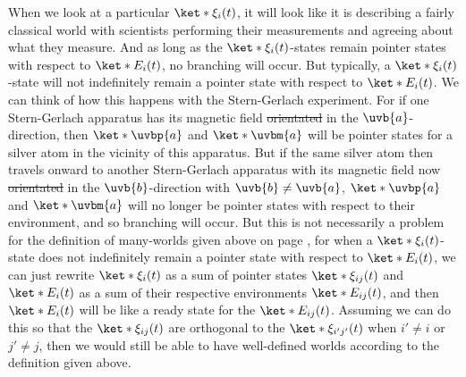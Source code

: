 \documentclass[12pt]{report}
\providecommand{\DIFadd}[1]{{\protect\color{blue}\uwave{#1}}} %
\providecommand{\DIFdel}[1]{{\protect\color{red}\sout{#1}}}                      %
\providecommand{\DIFaddbegin}{} %
\providecommand{\DIFaddend}{} %
\providecommand{\DIFdelbegin}{} %
\providecommand{\DIFdelend}{} %
\begin{document}
    When we look at a particular $\ket*{\xi_i(t)}$, it will look like it is describing a fairly classical world with scientists performing their measurements and agreeing about what they measure. And as long as the $\ket*{\xi_i(t)}$-states remain pointer states with respect to $\ket*{E_i(t)}$, no branching will occur. But typically, a $\ket*{\xi_i(t)}$-state will not indefinitely remain a pointer state with respect to $\ket*{E_i(t)}$. We can think of how this happens with the Stern-Gerlach experiment. For if one Stern-Gerlach apparatus has its magnetic field \DIFdelbegin \DIFdel{orientated }\DIFdelend \DIFaddbegin \DIFadd{oriented }\DIFaddend in the $\uvb{a}$-direction, then $\ket*{\uvbp{a}}$ and $\ket*{\uvbm{a}}$ will be pointer states for a silver atom in the vicinity of this apparatus. But if the same silver atom then travels onward to another Stern-Gerlach apparatus with its magnetic field now \DIFdelbegin \DIFdel{orientated }\DIFdelend \DIFaddbegin \DIFadd{oriented }\DIFaddend in the $\uvb{b}$-direction with $\uvb{b}\neq\uvb{a}$, $\ket*{\uvbp{a}}$ and $\ket*{\uvbm{a}}$ will no longer be pointer states with respect to their environment, and so branching will occur. But this is not necessarily a problem for the definition of many-worlds given above on page \pageref{rigorousworld}, for when a $\ket*{\xi_i(t)}$-state does not indefinitely remain a pointer state with respect to $\ket*{E_i(t)}$, we can just rewrite $\ket*{\xi_i(t)}$ as a sum of pointer states $\ket*{\xi_{ij}(t)}$ and $\ket*{E_i(t)}$  as a sum of their respective environments $\ket*{E_{ij}(t)}$, and then $\ket*{E_i(t)}$ will be like a ready state for the $\ket*{E_{ij}(t)}$. Assuming we can do this so that the $\ket*{\xi_{ij}(t)}$ are orthogonal to the $\ket*{\xi_{i'j'}(t)}$ when $i'\neq i$ or $j'\neq j$, then we would still be able to have well-defined worlds according to the definition given above. 




   

\end{document}
